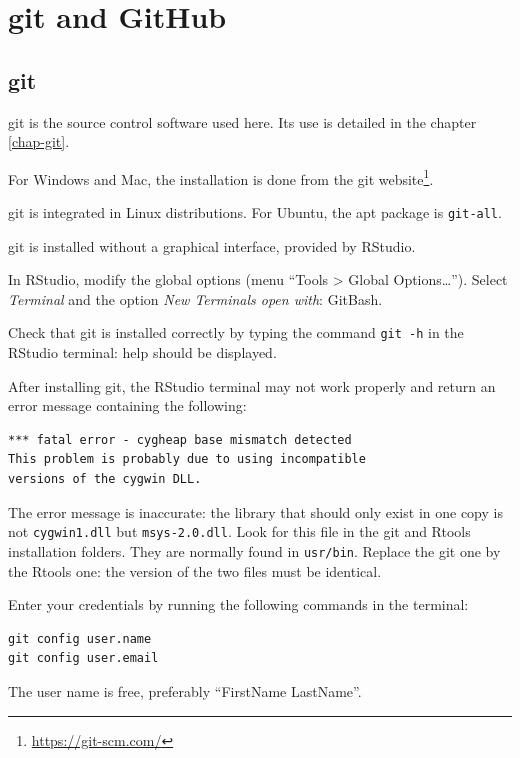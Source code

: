 \documentclass[
  12pt,
  american,
  a4paper,
  extrafontsizes,onecolumn,openright
  ]{memoir}
\newlength{\rf}
\begin{document}
\hypertarget{git-and-github}{%
\section{git and GitHub}\label{git-and-github}}

\hypertarget{git}{%
\subsection{git}\label{git}}

git is the source control software used here.
Its use is detailed in the chapter \ref{chap-git}.

For Windows and Mac, the installation is done from the git website\footnote{\url{https://git-scm.com/}}.

git is integrated in Linux distributions.
For Ubuntu, the apt package is \texttt{git-all}.

git is installed without a graphical interface, provided by RStudio.

In RStudio, modify the global options (menu \enquote{Tools \textgreater{} Global Options\ldots{}}).
Select \emph{Terminal} and the option \emph{New Terminals open with}: GitBash.

Check that git is installed correctly by typing the command \texttt{git\ -h} in the RStudio terminal: help should be displayed.

After installing git, the RStudio terminal may not work properly and return an error message containing the following:

\begin{verbatim}
*** fatal error - cygheap base mismatch detected
This problem is probably due to using incompatible 
versions of the cygwin DLL.
\end{verbatim}

The error message is inaccurate: the library that should only exist in one copy is not \texttt{cygwin1.dll} but \texttt{msys-2.0.dll}.
Look for this file in the git and Rtools installation folders.
They are normally found in \texttt{usr/bin}.
Replace the git one by the Rtools one: the version of the two files must be identical.

Enter your credentials by running the following commands in the terminal:

\begin{verbatim}
git config user.name
git config user.email
\end{verbatim}

The user name is free, preferably \enquote{FirstName LastName}.
\end{document}
